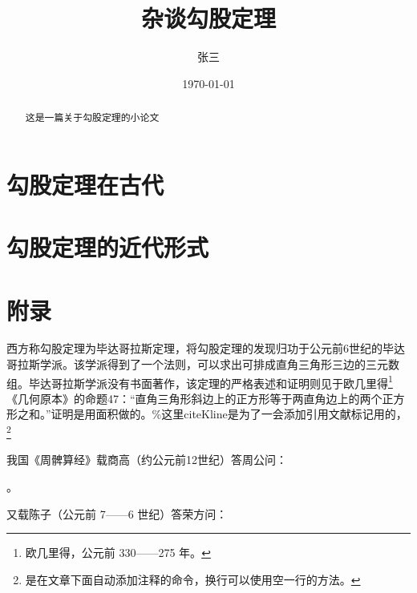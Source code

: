 \documentclass[UTF8]{ctexart}  %
\begin{document}
\title{杂谈勾股定理}  %
\author{张三}  %
\date{\today}    %
\maketitle     %

\begin{abstract}         %
\small{这是一篇关于勾股定理的小论文}
\end{abstract}

\tableofcontents  %
\section{勾股定理在古代}  %
\section{勾股定理的近代形式}
\section{附录}  %


\label{sec:ancient}  %
\small{西方称勾股定理为毕达哥拉斯定理，将勾股定理的发现归功于公元前6世纪的毕达哥拉斯学派}\cite{Kline}。该学派得到了一个法则，可以求出可排成直角三角形三边的三元数组。毕达哥拉斯学派没有书面著作，该定理的严格表述和证明则见于欧几里得\footnote{欧几里得，公元前 330——275 年。}《几何原本》的命题47：“直角三角形斜边上的正方形等于两直角边上的两个正方形之和。”证明是用面积做的。\%这里cite{Kline}是为了一会添加引用文献标记用的，\footnote{是在文章下面自动添加注释的命令，换行可以使用空一行的方法。}

\small 我国《周髀算经》载商高（约公元前12世纪）答周公问：

\footnotesize{}。%

\small 又载陈子（公元前 7——6 世纪）答荣方问：


\footnotesize{}
\end{document}
